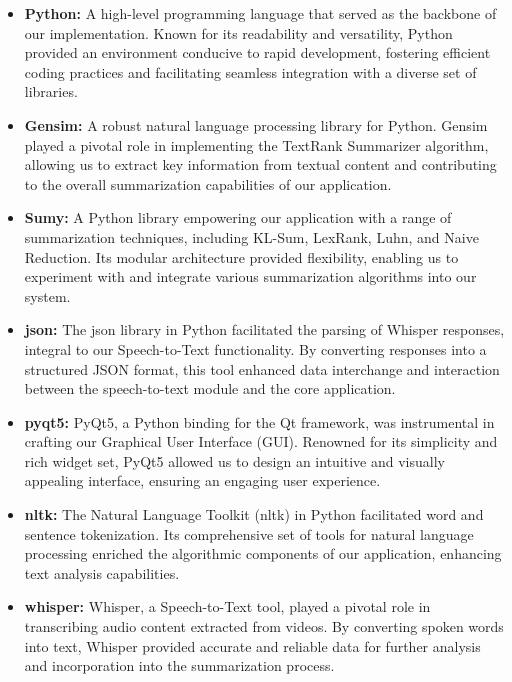 \documentclass{ieeeaccess}
\begin{document}
\begin{itemize}
    \item \textbf{Python:} A high-level programming language that served as the backbone of our implementation. Known for its readability and versatility, Python provided an environment conducive to rapid development, fostering efficient coding practices and facilitating seamless integration with a diverse set of libraries.

    \item \textbf{Gensim:} A robust natural language processing library for Python. Gensim played a pivotal role in implementing the TextRank Summarizer algorithm, allowing us to extract key information from textual content and contributing to the overall summarization capabilities of our application.

    \item \textbf{Sumy:} A Python library empowering our application with a range of summarization techniques, including KL-Sum, LexRank, Luhn, and Naive Reduction. Its modular architecture provided flexibility, enabling us to experiment with and integrate various summarization algorithms into our system.

    \item \textbf{json:} The json library in Python facilitated the parsing of Whisper responses, integral to our Speech-to-Text functionality. By converting responses into a structured JSON format, this tool enhanced data interchange and interaction between the speech-to-text module and the core application.

    \item \textbf{pyqt5:} PyQt5, a Python binding for the Qt framework, was instrumental in crafting our Graphical User Interface (GUI). Renowned for its simplicity and rich widget set, PyQt5 allowed us to design an intuitive and visually appealing interface, ensuring an engaging user experience.

    \item \textbf{nltk:} The Natural Language Toolkit (nltk) in Python facilitated word and sentence tokenization. Its comprehensive set of tools for natural language processing enriched the algorithmic components of our application, enhancing text analysis capabilities.

    \item \textbf{whisper:} Whisper, a Speech-to-Text tool, played a pivotal role in transcribing audio content extracted from videos. By converting spoken words into text, Whisper provided accurate and reliable data for further analysis and incorporation into the summarization process.


\end{itemize}
\end{document}

